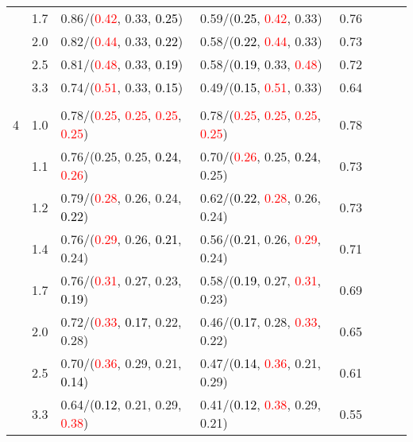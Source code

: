 \documentclass[10pt,a4paper]{report}
\begin{document}
\begin{table}[!htbp]
\begin{center}
{\begin{tabular}{ccllcccc}
			&1.7&0.86/(\textcolor{red}{0.42}, 0.33, \textcolor{black}{0.25})&0.59/(\textcolor{black}{0.25}, \textcolor{red}{0.42}, 0.33)&0.76\\
			&2.0&0.82/(\textcolor{red}{0.44}, 0.33, \textcolor{black}{0.22})&0.58/(\textcolor{black}{0.22}, \textcolor{red}{0.44}, 0.33)&0.73\\
			&2.5&0.81/(\textcolor{red}{0.48}, 0.33, \textcolor{black}{0.19})&0.58/(\textcolor{black}{0.19}, 0.33, \textcolor{red}{0.48})&0.72\\
			&3.3&0.74/(\textcolor{red}{0.51}, 0.33, \textcolor{black}{0.15})&0.49/(\textcolor{black}{0.15}, \textcolor{red}{0.51}, 0.33)&0.64\\
			&&&&\\
			4			&1.0&0.78/(\textcolor{red}{0.25}, \textcolor{red}{0.25}, \textcolor{red}{0.25}, \textcolor{red}{0.25})&0.78/(\textcolor{red}{0.25}, \textcolor{red}{0.25}, \textcolor{red}{0.25}, \textcolor{red}{0.25})&0.78\\
			&1.1&0.76/(0.25, 0.25, \textcolor{black}{0.24}, \textcolor{red}{0.26})&0.70/(\textcolor{red}{0.26}, 0.25, \textcolor{black}{0.24}, 0.25)&0.73\\
			&1.2&0.79/(\textcolor{red}{0.28}, 0.26, 0.24, \textcolor{black}{0.22})&0.62/(\textcolor{black}{0.22}, \textcolor{red}{0.28}, 0.26, 0.24)&0.73\\
			&1.4&0.76/(\textcolor{red}{0.29}, 0.26, \textcolor{black}{0.21}, 0.24)&0.56/(\textcolor{black}{0.21}, 0.26, \textcolor{red}{0.29}, 0.24)&0.71\\
			&1.7&0.76/(\textcolor{red}{0.31}, 0.27, 0.23, \textcolor{black}{0.19})&0.58/(\textcolor{black}{0.19}, 0.27, \textcolor{red}{0.31}, 0.23)&0.69\\
			&2.0&0.72/(\textcolor{red}{0.33}, \textcolor{black}{0.17}, 0.22, 0.28)&0.46/(\textcolor{black}{0.17}, 0.28, \textcolor{red}{0.33}, 0.22)&0.65\\
			&2.5&0.70/(\textcolor{red}{0.36}, 0.29, 0.21, \textcolor{black}{0.14})&0.47/(\textcolor{black}{0.14}, \textcolor{red}{0.36}, 0.21, 0.29)&0.61\\
			&3.3&0.64/(\textcolor{black}{0.12}, 0.21, 0.29, \textcolor{red}{0.38})&0.41/(\textcolor{black}{0.12}, \textcolor{red}{0.38}, 0.29, 0.21)&0.55\\
			\bottomrule
		\end{tabular}}
	\end{center}
\end{table}
\end{document}
